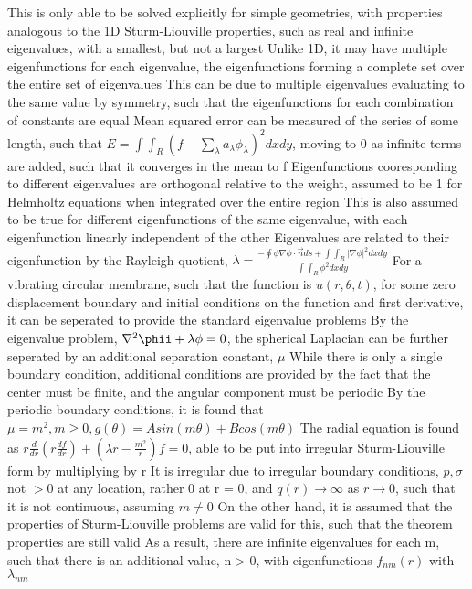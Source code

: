 \documentclass[11 pt, twoside]{article}
\newenvironment{outline*}
{
	\begin{outline}[enumerate]
	}
	{\end{outline}
}
\begin{document}
\begin{outline*}
	\2 This is only able to be solved explicitly for simple geometries, with properties analogous to the 1D Sturm-Liouville properties, such as real and infinite eigenvalues, with a smallest, but not a largest
		\3 Unlike 1D, it may have multiple eigenfunctions for each eigenvalue, the eigenfunctions forming a complete set over the entire set of eigenvalues
			\4 This can be due to multiple eigenvalues evaluating to the same value by symmetry, such that the eigenfunctions for each combination of constants are equal
			\4 Mean squared error can be measured of the series of some length, such that $E = \int\int_R (f - \sum_{\lambda} a_{\lambda}\phi_{\lambda})^2 dxdy$, moving to 0 as infinite terms are added, such that it converges in the mean to f
		\3 Eigenfunctions cooresponding to different eigenvalues are orthogonal relative to the weight, assumed to be 1 for Helmholtz equations when integrated over the entire region
			\4 This is also assumed to be true for different eigenfunctions of the same eigenvalue, with each eigenfunction linearly independent of the other
		\3 Eigenvalues are related to their eigenfunction by the Rayleigh quotient, $\lambda = \frac{-\oint \phi \nabla \phi \cdot \vec{n} ds + \int\int_R |\nabla \phi|^2 dx dy}{\int \int_R \phi^2 dx dy}$
\1 For a vibrating circular membrane, such that the function is $u(r, \theta, t)$, for some zero displacement boundary and initial conditions on the function and first derivative, it can be seperated to provide the standard eigenvalue problems
	\2 By the eigenvalue problem, $\nabla^2\phii + \lambda \phi = 0$, the spherical Laplacian can be further seperated by an additional separation constant, $\mu$
	\2 While there is only a single boundary condition, additional conditions are provided by the fact that the center must be finite, and the angular component must be periodic
		\3 By the periodic boundary conditions, it is found that $\mu = m^2, m \geq 0, g(\theta) = Asin(m\theta) + Bcos(m\theta)$
	\2 The radial equation is found as $r\frac{d}{dr}(r\frac{df}{dr}) + (\lambda r - \frac{m^2}{r})f = 0$, able to be put into irregular Sturm-Liouville form by multiplying by r
		\3 It is irregular due to irregular boundary conditions, $p, \sigma$ not $>0$ at any location, rather 0 at r = 0, and $q(r) \to \infty$ as $r \to 0$, such that it is not continuous, assuming $m \neq 0$
		\3 On the other hand, it is assumed that the properties of Sturm-Liouville problems are valid for this, such that the theorem properties are still valid
			\4 As a result, there are infinite eigenvalues for each m, such that there is an additional value, n > 0, with eigenfunctions $f_{nm}(r)$ with $\lambda_{nm}$

\end{outline*}
\end{document}

